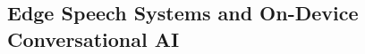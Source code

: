 \documentclass[manuscript,]{acmart} %
\begin{document}
\subsection{Edge Speech Systems and On-Device Conversational AI}
%
%
%
%
\end{document}
